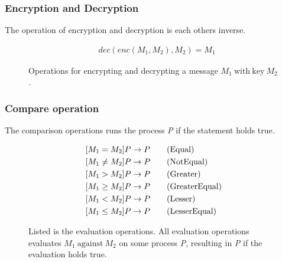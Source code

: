 \subsubsection{Encryption and Decryption}
The operation of encryption and decryption is each others inverse.
\begin{figure}[h]
    \begin{align*}
        &dec(enc(M_1, M_2),M_2) = M_1 \tag{Decrypt}
    \end{align*}
    \caption{Operations for encrypting and decrypting a message $M_1\ \mathrm{with\ key}\ M_2$.}
\end{figure}
\FloatBarrier

\subsubsection{Compare operation}
The comparison operations runs the process \textit{P} if the statement holds true.
\begin{figure}[h]
    \begin{align}
        &[M_1 = M_2]P \rightarrow P \tag{Equal}\\
        &[M_1 \neq M_2]P \rightarrow P \tag{NotEqual}\\
        &[M_1 > M_2]P \rightarrow P \tag{Greater}\\
        &[M_1 \geq M_2]P \rightarrow P \tag{GreaterEqual}\\
        &[M_1 < M_2]P \rightarrow P \tag{Lesser}\\
        &[M_1 \leq M_2]P \rightarrow P \tag{LesserEqual}
    \end{align}
    \caption{Listed is the evaluation operations. All evaluation operations evaluates $M_1\ \mathrm{against}\ M_2$ on some process \textit{P}, resulting in \textit{P} if the evaluation holds true.}
\end{figure}

\FloatBarrier


